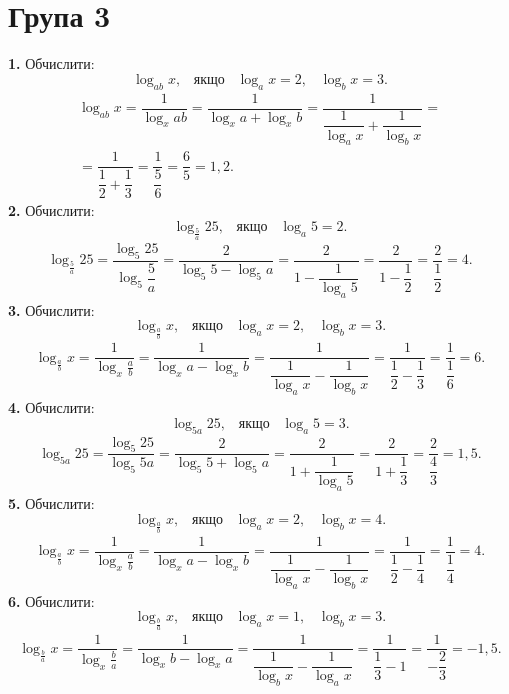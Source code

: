 \section*{Група 3}
\textbf{1.} Обчислити:
$$
\log_{ab}x, \;\;\; \mbox{якщо} \;\;\; \log_{a}x=2, \;\;\; \log_{b}x=3.
$$
\begin{multline*}
\log_{ab}x =\dfrac{1}{\log_{x}ab}=\dfrac{1}{\log_{x}a+\log_{x}b}=
\dfrac{1}{\dfrac{1}{\log_{a}x}+\dfrac{1}{\log_{b}x}}=\\
=\dfrac{1}{\dfrac{1}{2}+\dfrac{1}{3}}=\dfrac{1}{\dfrac{5}{6}}=\dfrac{6}{5}=1,2.
\end{multline*}
\textbf{2.} Обчислити:
$$
\log_{\frac{5}{a}}25, \;\;\; \mbox{якщо} \;\;\; \log_{a}5=2.
$$
\begin{multline*}
\log_{\frac{5}{a}}25=
\dfrac{\log_{5}25}{\log_{5}\dfrac{5}{a}}=
\dfrac{2}{\log_{5}5-\log_{5}a}=
\dfrac{2}{1-\dfrac{1}{\log_{a}5}}=
\dfrac{2}{1-\dfrac{1}{2}}=\dfrac{2}{\dfrac{1}{2}}=4.
\end{multline*}
\textbf{3.} Обчислити:
$$
\log_{\frac{a}{b}}x, \;\;\; \mbox{якщо} \;\;\; \log_{a}x=2, \;\;\; \log_{b}x=3.
$$
\begin{gather*}
\log_{\frac{a}{b}}x =\dfrac{1}{\log_{x}\frac{a}{b}}=\dfrac{1}{\log_{x}a-\log_{x}b}=
\dfrac{1}{\dfrac{1}{\log_{a}x}-\dfrac{1}{\log_{b}x}}=
\dfrac{1}{\dfrac{1}{2}-\dfrac{1}{3}}=\dfrac{1}{\dfrac{1}{6}}=6.
\end{gather*}
\textbf{4.} Обчислити:
$$
\log_{5a}25, \;\;\; \mbox{якщо} \;\;\; \log_{a}5=3.
$$
\begin{gather*}
\log_{5a}25=
\dfrac{\log_{5}25}{\log_{5}5a}=
\dfrac{2}{\log_{5}5+\log_{5}a}=
\dfrac{2}{1+\dfrac{1}{\log_{a}5}}=
\dfrac{2}{1+\dfrac{1}{3}}=
\dfrac{2}{\dfrac{4}{3}}=1,5.
\end{gather*}
\textbf{5.} Обчислити:
$$
\log_{\frac{a}{b}}x, \;\;\; \mbox{якщо} \;\;\; \log_{a}x=2, \;\;\; \log_{b}x=4.
$$
\begin{gather*}
\log_{\frac{a}{b}}x =\dfrac{1}{\log_{x}\frac{a}{b}}=\dfrac{1}{\log_{x}a-\log_{x}b}=
\dfrac{1}{\dfrac{1}{\log_{a}x}-\dfrac{1}{\log_{b}x}}=
\dfrac{1}{\dfrac{1}{2}-\dfrac{1}{4}}=\dfrac{1}{\dfrac{1}{4}}=4.
\end{gather*}
\textbf{6.} Обчислити:
$$
\log_{\frac{b}{a}}x, \;\;\; \mbox{якщо} \;\;\; \log_{a}x=1, \;\;\; \log_{b}x=3.
$$
\begin{gather*}
\log_{\frac{b}{a}}x =\dfrac{1}{\log_{x}\frac{b}{a}}=\dfrac{1}{\log_{x}b-\log_{x}a}=
\dfrac{1}{\dfrac{1}{\log_{b}x}-\dfrac{1}{\log_{a}x}}=
\dfrac{1}{\dfrac{1}{3}-1}=\dfrac{1}{-\dfrac{2}{3}}=-1,5.
\end{gather*}
